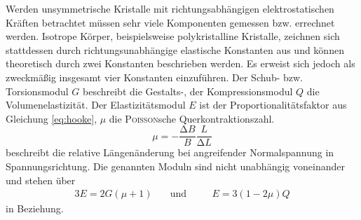 Werden unsymmetrische Kristalle mit richtungsabhängigen elektrostatischen Kräften betrachtet müssen sehr viele Komponenten gemessen bzw. errechnet werden. 
Isotrope Körper, beispielsweise polykristalline Kristalle, zeichnen sich stattdessen durch richtungsunabhängige elastische Konstanten aus und können theoretisch durch zwei Konstanten beschrieben werden. 
Es erweist sich jedoch als zweckmäßig insgesamt vier Konstanten einzuführen.
Der Schub- bzw. Torsionsmodul $G$ beschreibt die Gestalts-, der Kompressionsmodul $Q$ die Volumenelastizität.
Der Elastizitätsmodul $E$ ist der Proportionalitätsfaktor aus Gleichung \eqref{eq:hooke}, $\mu$ die \textsc{Poisson}sche Querkontraktionszahl. 
\begin{equation}
\mu=-\frac{\mathup{\Delta}{B}}{B}\frac{L}{\mathup{\Delta}{L}}
\label{eq:mu}
\end{equation}
beschreibt die relative Längenänderung bei angreifender Normalspannung in Spannungsrichtung.
Die genannten Moduln sind nicht unabhängig voneinander und stehen über
\begin{alignat}{3}
	 E=2G(\mu+1) &\quad\text{und} &&\quad E=3(1-2\mu)Q
\label{eq:modulbeziehungen}
\end{alignat}
in Beziehung.

